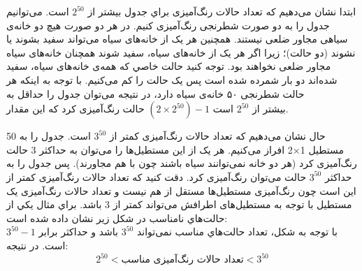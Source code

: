     \p
    ابتدا نشان می‌دهیم که تعداد حالات رنگ‌آمیزی براي جدول بیشتر از 
    $2^{50}$
    است.
  می‌توانیم جدول را به دو صورت شطرنجی رنگ‌آمیزی ‌کنیم. در هر دو صورت هیچ دو خانه‌ی سیاهی مجاور ضلعی نیستند. همچنین هر یک از خانه‌های سیاه می‌تواند سفید بشوند یا نشوند (دو حالت)؛ زیرا اگر هر یک از خانه‌های سیاه، سفید شوند همچنان خانه‌های سیاه مجاور ضلعی نخواهند بود. 
  ‌توجه كنيد حالت خاصي كه همه‌ی خانه‌های سیاه، سفید شده‌اند دو بار شمرده شده است پس یک حالت را کم می‌کنیم.
  با توجه به اینکه هر حالت شطرنجی ۵۰ خانه‌ی سیاه دارد، در نتیجه می‌توان جدول را حداقل به
   $ (2 \times 2^{50})- 1 $ 
   حالت رنگ‌آمیزی کرد که این مقدار‎
    بیشتر از 
   $2^{50}$
  است.

    \p
     حال نشان می‌دهیم که تعداد حالات رنگ‌آمیزی کمتر از 
     $3^{50}$
     است.
      جدول را به 50 مستطیل 1×2 افراز می‌کنیم. هر یک از این مستطیل‌ها را می‌توان به حداکثر 3 حالت رنگ‌آمیزی کرد (هر دو خانه نمی‌توانند سیاه باشند چون با هم مجاورند). پس جدول را به حداکثر $3^{50}$ حالت می‌توان رنگ‌آمیزی کرد. دقت کنید که تعداد حالات رنگ‌آمیزی کمتر از این است چون رنگ‌آمیزی مستطیل‌ها مستقل از هم نیست و تعداد حالات رنگ‌آمیزی یک مستطیل با توجه به مستطیل‌های اطرافش می‌تواند کمتر از 3 باشد.
     براي مثال يكي از حالت‌هاي نامناسب در شكل زير نشان داده شده است:
     \\  
      با توجه به شكل، تعداد حالت‌هاي مناسب نمی‌تواند  
      $3^{50}$
       باشد و حداکثر برابر
      $3^{50}-1$
     است.
    \p
    در نتیجه:
    $$2^{50} < \text{تعداد حالات رنگ‌آمیزی مناسب} < 3^{50}$$
